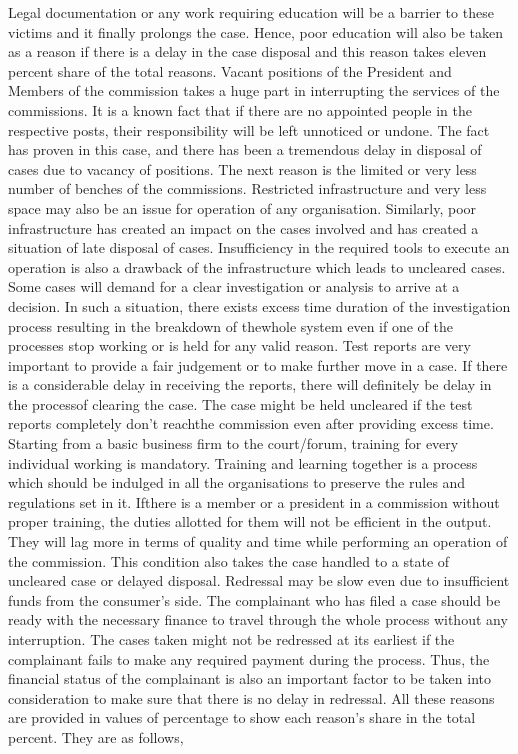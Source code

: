 \begin{multicols}{2}
\noi
Legal documentation or any work requiring education will be a barrier to these victims and it
finally prolongs the case. Hence, poor education will also be taken as a reason if there is a delay
in the case disposal and this reason takes eleven percent share of the total reasons. Vacant
positions of the President and Members of the commission takes a huge part in interrupting the
services of the commissions. It is a known fact that if there are no appointed people in the
respective posts, their responsibility will be left unnoticed or undone. The fact has proven in
this case, and there has been a tremendous delay in disposal of cases due to vacancy of
positions. The next reason is the limited or very less number of benches of the commissions.
Restricted infrastructure and very less space may also be an issue for operation of any
organisation. Similarly, poor infrastructure has created an impact on the cases involved and has
created a situation of late disposal of cases. Insufficiency in the required tools to execute an
operation is also a drawback of the infrastructure which leads to uncleared cases. Some cases 
will demand for a clear investigation or analysis to arrive at a decision. In such a situation, there
exists excess time duration of the investigation process resulting in the breakdown of thewhole
system even if one of the processes stop working or is held for any valid reason. Test reports
are very important to provide a fair judgement or to make further move in a case. If there is a
considerable delay in receiving the reports, there will definitely be delay in the processof clearing
the case. The case might be held uncleared if the test reports completely don’t reachthe
commission even after providing excess time. Starting from a basic business firm to the
court/forum, training for every individual working is mandatory. Training and learning together
is a process which should be indulged in all the organisations to preserve the rules and
regulations set in it. Ifthere is a member or a president in a commission without proper training,
the duties allotted for them will not be efficient in the output. They will lag more in terms of
quality and time while performing an operation of the commission. This condition also takes
the case handled to a state of uncleared case or delayed disposal. Redressal may be slow even
due to insufficient funds from the consumer’s side. The complainant who has filed a case
should be ready with the necessary finance to travel through the whole process without any
interruption. The cases taken might not be redressed at its earliest if the complainant fails to
make any required payment during the process. Thus, the financial status of the complainant is
also an important factor to be taken into consideration to make sure that there is no delay in
redressal. All these reasons are provided in values of percentage to show each reason’s share
in the total percent. They are as follows,


\end{multicols}
